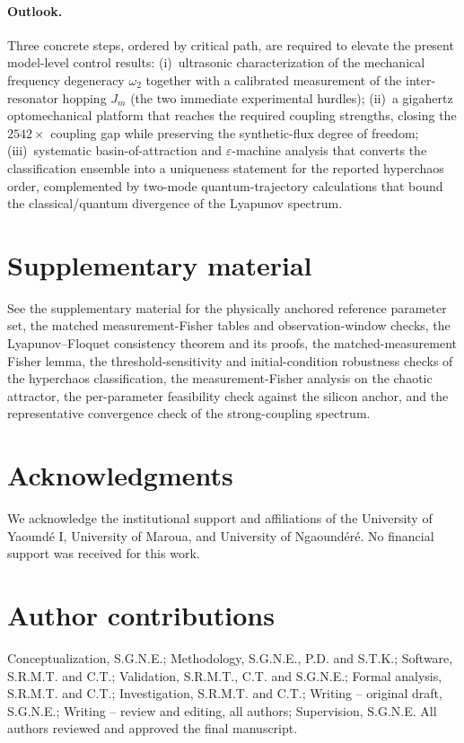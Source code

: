 \documentclass[preprint,numbers,a4paper]{elsarticle}
\begin{document}
\paragraph{Outlook.}
Three concrete steps, ordered by critical path, are required to elevate the present model-level control results:
(i)~ultrasonic characterization of the mechanical frequency degeneracy $\omega_2$ together with a calibrated measurement of the inter-resonator hopping $J_m$ (the two immediate experimental hurdles);
(ii)~a gigahertz optomechanical platform that reaches the required coupling strengths, closing the $\num{2542}\times$ coupling gap while preserving the synthetic-flux degree of freedom;
(iii)~systematic basin-of-attraction and $\varepsilon$-machine analysis that converts the classification ensemble into a uniqueness statement for the reported hyperchaos order, complemented by two-mode quantum-trajectory calculations that bound the classical/quantum divergence of the Lyapunov spectrum.

\section*{Supplementary material}
See the supplementary material for the physically anchored reference parameter set, the matched measurement-Fisher tables and observation-window checks, the Lyapunov--Floquet consistency theorem and its proofs, the matched-measurement Fisher lemma, the threshold-sensitivity and initial-condition robustness checks of the hyperchaos classification, the measurement-Fisher analysis on the chaotic attractor, the per-parameter feasibility check against the silicon anchor, and the representative convergence check of the strong-coupling spectrum.

\section*{Acknowledgments}
We acknowledge the institutional support and affiliations of the University of Yaound\'e I, University of Maroua, and University of Ngaound\'er\'e. No financial support was received for this work.

\section*{Author contributions}
Conceptualization, S.G.N.E.; Methodology, S.G.N.E., P.D. and S.T.K.; Software, S.R.M.T. and C.T.; Validation, S.R.M.T., C.T. and S.G.N.E.; Formal analysis, S.R.M.T. and C.T.; Investigation, S.R.M.T. and C.T.; Writing -- original draft, S.G.N.E.; Writing -- review and editing, all authors; Supervision, S.G.N.E. All authors reviewed and approved the final manuscript.
\end{document}

